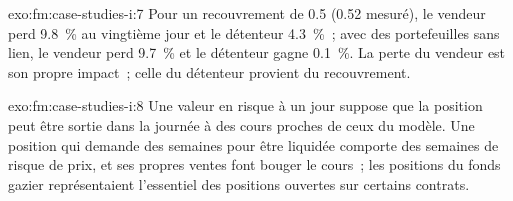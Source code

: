 \begin{solution}{exo:fm:case-studies-i:7}
Pour un recouvrement de 0.5 (0.52 mesuré), le vendeur perd 9.8~\% au vingtième jour et le détenteur 4.3~\%~; avec des portefeuilles sans lien, le vendeur perd 9.7~\% et le
détenteur gagne 0.1~\%. La perte du vendeur est son propre impact~; celle du détenteur provient du recouvrement.
\end{solution}

\begin{solution}{exo:fm:case-studies-i:8}
Une valeur en risque à un jour suppose que la position peut être sortie dans la journée à des cours proches de ceux du modèle. Une position qui demande des semaines pour être liquidée comporte des semaines
de risque de prix, et ses propres ventes font bouger le cours~; les positions du fonds gazier représentaient l'essentiel des positions ouvertes sur certains contrats.
\end{solution}

